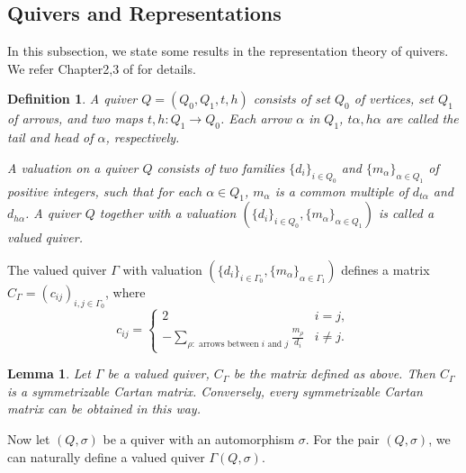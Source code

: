 \documentclass[12pt]{amsart}
\newtheorem{lemma}[theorem]{Lemma}
\newtheorem{definition}[theorem]{Definition}
\begin{document}
\subsection{Quivers and Representations}

In this subsection, we state some results in the representation theory of quivers.
We refer Chapter2,3 of \cite{Deng} for details.

\begin{definition}
    A quiver $Q=(Q_0,Q_1,t,h)$ consists of set $Q_0$ of vertices, set $Q_1$ of arrows, and two maps $t,h:Q_1\rightarrow Q_0$.
    Each arrow $\alpha$ in $Q_1$, $t\alpha, h\alpha$ are called the tail and head of $\alpha$, respectively.

    A valuation on a quiver $Q$ consists of two families $\{ d_i\}_{i\in Q_0}$ and $\{ m_{\alpha}\}_{\alpha \in Q_1}$ of positive integers, such that for each $\alpha \in Q_1$, $m_{\alpha}$ is a common multiple of $d_{t\alpha}$ and $d_{h\alpha}$.
    A quiver $Q$ together with a valuation $(\{ d_i\}_{i\in Q_0} , \{ m_{\alpha}\}_{\alpha \in Q_1})$ is called a valued quiver. 
\end{definition}


The valued quiver $\Gamma$ with valuation $(\{ d_i\}_{i\in \Gamma_0} , \{ m_{\alpha}\}_{\alpha \in \Gamma_1})$ defines a matrix $C_{\Gamma} = (c_{ij})_{i,j\in \Gamma_0}$, where 
\begin{equation*}
    c_{ij} = 
    \begin{cases}
        2  \qquad  & i=j,\\
        -\sum\limits_{\rho: \text{ arrows between } i \text{ and } j }   \frac{m_{\rho}}{d_i}            & i\neq j.
    \end{cases}
\end{equation*}


\begin{lemma} \cite[Lemma 3.5]{Deng} 
    Let $\Gamma$ be a valued quiver, $C_{\Gamma}$ be the matrix defined as above.
    Then $C_{\Gamma}$ is a symmetrizable Cartan matrix.
    Conversely, every symmetrizable Cartan matrix can be obtained in this way.
\end{lemma}


Now let $(Q,\sigma)$ be a quiver with an automorphism $\sigma$.
For the pair $(Q,\sigma)$, we can naturally define a valued quiver $\Gamma(Q,\sigma)$.
\end{document}
